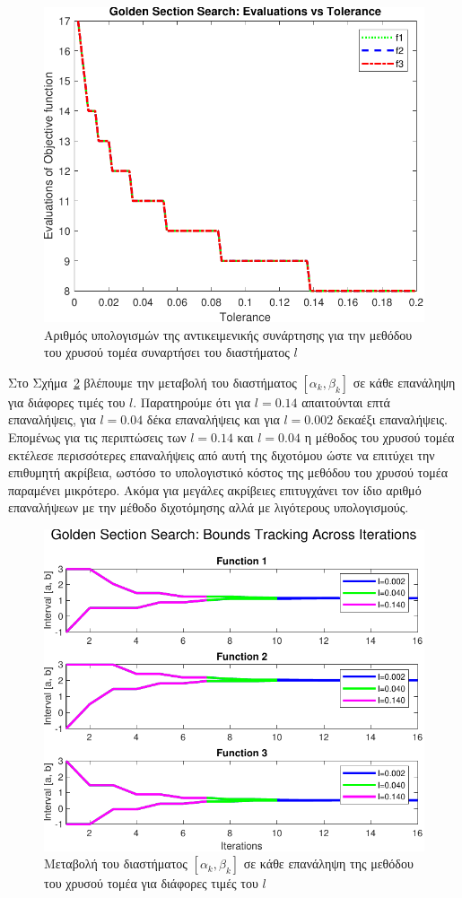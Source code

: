 \documentclass{article}
\begin{document}
\begin{figure}
    \centering
    \includegraphics[width=0.75\linewidth]{plots/task2_plot1.pdf}
    \caption{Αριθμός υπολογισμών της αντικειμενικής συνάρτησης για την μεθόδου του χρυσού τομέα συναρτήσει του διαστήματος $l$}
    \label{fig:task2_plot1}
\end{figure}

Στο Σχήμα~\ref{fig:task2_plot2} βλέπουμε την μεταβολή του διαστήματος $[\alpha_k, \beta_k]$ 
σε κάθε επανάληψη για διάφορες τιμές του $l$. Παρατηρούμε ότι για $l = 0.14$ απαιτούνται επτά
επαναλήψεις, για $l = 0.04$ δέκα επαναλήψεις και για $l = 0.002$ δεκαέξι επαναλήψεις. Επομένως
για τις περιπτώσεις των $l = 0.14$ και $l = 0.04$ η μέθοδος του χρυσού τομέα εκτέλεσε περισσότερες
επαναλήψεις από αυτή της διχοτόμου ώστε να επιτύχει την επιθυμητή ακρίβεια, ωστόσο το υπολογιστικό
κόστος της μεθόδου του χρυσού τομέα παραμένει μικρότερο. Ακόμα για μεγάλες ακρίβειες επιτυγχάνει
τον ίδιο αριθμό επαναλήψεων με την μέθοδο διχοτόμησης αλλά με λιγότερους υπολογισμούς.

\begin{figure}
    \centering
    \includegraphics[width=0.75\linewidth]{plots/task2_plot2.pdf}
    \caption{Μεταβολή του διαστήματος $[\alpha_k, \beta_k]$ σε κάθε επανάληψη της μεθόδου του χρυσού τομέα για διάφορες τιμές του $l$}
    \label{fig:task2_plot2}
\end{figure}
\end{document}
